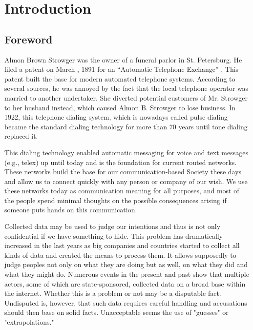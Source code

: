 
\part{Introduction}
\chapter{Foreword}
Almon Brown Strowger was the owner of a funeral parlor in St. Petersburg. He filed a patent on March , 1891 for an ``Automatic Telephone Exchange'' \cite{pulseDialingPatent}. This patent built the base for modern automated telephone systems. According to several sources, he was annoyed by the fact that the local telephone operator was married to another undertaker. She diverted potential customers of Mr. Strowger to her husband instead, which caused Almon B. Strowger to lose business. In 1922, this telephone dialing system, which is nowadays called pulse dialing became the standard dialing technology for more than 70 years until tone dialing replaced it.

This dialing technology enabled automatic messaging for voice and text messages (e.g., telex) up until today and is the foundation for current routed networks. These networks build the base for our communication-based Society these days and allow us to connect quickly with any person or company of our wish. We use these networks today as communication meaning for all purposes, and most of the people spend minimal thoughts on the possible consequences arising if someone puts hands on this communication. 

Collected data may be used to judge our intentions and thus is not only confidential if we have something to hide. This problem has dramatically increased in the last years as big companies and countries started to collect all kinds of data and created the means to process them. It allows supposedly to judge peoples not only on what they are doing but as well, on what they did and what they might do. Numerous events in the present and past show that multiple actors, some of which are state-sponsored, collected data on a broad base within the internet. Whether this is a problem or not may be a disputable fact. Undisputed is, however, that such data requires careful handling and accusations should then base on solid facts. Unacceptable seems the use of "guesses" or "extrapolations." 

